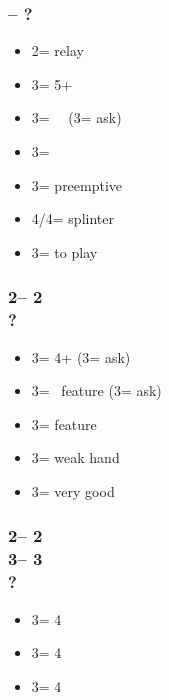 \documentclass[12pt, a4paper]{report}
\begin{document}
{{{            \subsubsection*{\alrts{2\spades} -- ?}
            \begin{itemize}
                \item 2\nt = relay
                \item 3\clubs = 5+\hearts\ \fonce
                \item 3\diams = \minor\ \gf\ (3\hearts = ask)
                \item 3\hearts = \spades\ \invp
                \item 3\spades = preemptive
                \item 4\minor/4\hearts = splinter
                \item 3\nt = to play
            \end{itemize}

            \subsubsection*{2\spades -- 2\nt\\
                            ?}
            \begin{itemize}
                \item 3\clubs = 4+\twosuit{\minor}{\hearts} (3\diams = ask)
                \item 3\diams = \minor\ feature (3\hearts = ask)
                \item 3\hearts = \hearts feature
                \item 3\spades = weak hand
                \item 3\nt = very good \spades
            \end{itemize}

            \subsubsection*{2\spades -- 2\nt\\
                            3\clubs -- 3\diams\\
                            ?}
            \begin{itemize}
                \item 3\hearts = 4\hearts
                \item 3\spades = 4\clubs
                \item 3\nt = 4\diams
            \end{itemize}

}}}
\end{document}
